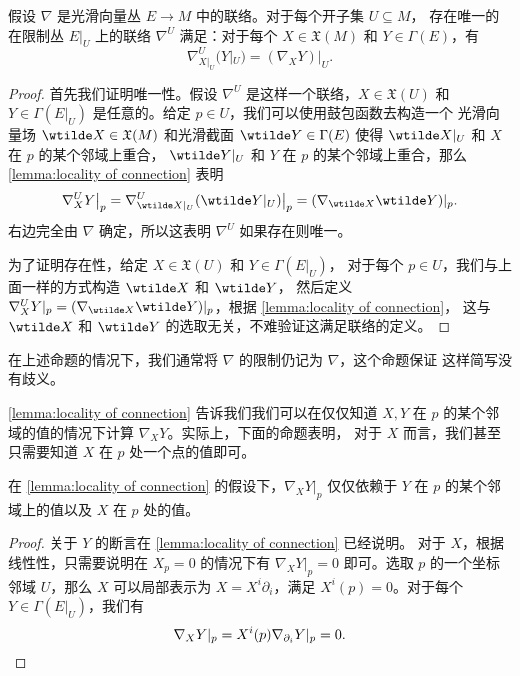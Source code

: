 \documentclass[fontset=none]{Notes}
\begin{document}
\begin{proposition}[联络的限制]\label{prop:restriction of connection}
  假设 $\nabla$ 是光滑向量丛 $E\to M$ 中的联络。对于每个开子集 $U\subseteq M$，
  存在唯一的在限制丛 $E|_U$ 上的联络 $\nabla^U$ 满足：对于每个
  $X\in \mathfrak{X}(M)$ 和 $Y\in\Gamma(E)$，有
  \begin{equation}
    \nabla_{X|_U}^U(Y|_U)=(\nabla_XY)|_U.
  \end{equation}
\end{proposition}
\begin{proof}
  首先我们证明唯一性。假设 $\nabla^U$ 是这样一个联络，$X\in \mathfrak{X}(U)$
  和 $Y\in\Gamma(E|_U)$ 是任意的。给定 $p\in U$，我们可以使用鼓包函数去构造一个
  光滑向量场 $\wtilde X\in \mathfrak{X}(M)$ 和光滑截面 $\wtilde Y\in \Gamma(E)$
  使得 $\wtilde X|_U$ 和 $ X$ 在 $p$ 的某个邻域上重合，
  $\wtilde Y|_U$ 和 $ Y$ 在 $p$ 的某个邻域上重合，那么
  \autoref{lemma:locality of connection} 表明
  \[
    \nabla_X^UY\big|_p= \nabla_{\wtilde X|_U}^U (\wtilde Y|_U)\big|_p
    =(\nabla_{\wtilde X}\wtilde Y)|_p.
  \]
  右边完全由 $\nabla$ 确定，所以这表明 $\nabla^U$ 如果存在则唯一。

  为了证明存在性，给定 $X\in \mathfrak{X}(U)$ 和 $Y\in \Gamma(E|_U)$，
  对于每个 $p\in U$，我们与上面一样的方式构造 $\wtilde X$ 和 $\wtilde Y$，
  然后定义 $\nabla_X^UY|_p=(\nabla_{\wtilde X}\wtilde Y)|_p$，根据 \autoref{lemma:locality of connection}，
  这与 $\wtilde X$ 和 $\wtilde Y$ 的选取无关，不难验证这满足联络的定义。
\end{proof}

在上述命题的情况下，我们通常将 $\nabla$ 的限制仍记为 $\nabla$，这个命题保证
这样简写没有歧义。

\autoref{lemma:locality of connection} 告诉我们我们可以在仅仅知道
$X,Y$ 在 $p$ 的某个邻域的值的情况下计算 $\nabla_XY$。实际上，下面的命题表明，
对于 $X$ 而言，我们甚至只需要知道 $X$ 在 $p$ 处一个点的值即可。

\begin{proposition}\label{prop:connection depends on X at one point}
  在 \autoref{lemma:locality of connection} 的假设下，$\nabla_XY|_p$
  仅仅依赖于 $Y$ 在 $p$ 的某个邻域上的值以及 $X$ 在 $p$ 处的值。
\end{proposition}
\begin{proof}
  关于 $Y$ 的断言在 \autoref{lemma:locality of connection} 已经说明。
  对于 $X$，根据线性性，只需要说明在 $X_p=0$ 的情况下有
  $\nabla_XY|_p=0$ 即可。选取 $p$ 的一个坐标邻域 $U$，那么 $X$ 可以局部表示为
  $X=X^i\partial_i$，满足 $X^i(p)=0$。对于每个 $Y\in\Gamma(E|_U)$，我们有
  \[
    \nabla_XY|_p=X^i(p)\nabla_{\partial_i}Y|_p=0.\qedhere  
  \]
\end{proof}
\end{document}
